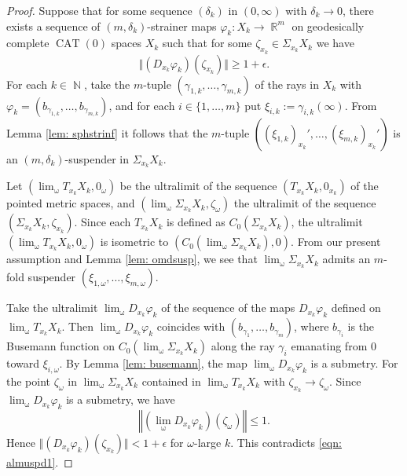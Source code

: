 \documentclass[a4paper,12pt]{amsart}
\newcommand{\CAT}{\operatorname{CAT}}
\newcommand{\ulim}{\operatorname{\lim_{\omega}}}
\newcommand{\R}{\operatorname{\mathbb{R}}}
\newcommand{\N}{\operatorname{\mathbb{N}}}
\numberwithin{equation}{section}
\theoremstyle{plain}
\theoremstyle{definition}
\theoremstyle{remark}
\begin{document}
\begin{proof}
Suppose that for some sequence $(\delta_k)$ in $(0,\infty)$ 
with $\delta_k \to 0$,
there exists a sequence of $(m,\delta_k)$-strainer maps
$\varphi_k \colon X_k \to \R^m$
on geodesically complete $\CAT(0)$ spaces $X_k$
such that for some $\zeta_{x_k} \in \Sigma_{x_k}X_k$ 
we have
\begin{equation}
\Vert \left( D_{x_k}\varphi_k \right) \left( \zeta_{x_k} \right) \Vert 
\ge 1+\epsilon.
\label{eqn: almuspd1}
\end{equation}
For each $k \in \N$,
take the $m$-tuple 
$\left( \gamma_{1,k}, \dots, \gamma_{m,k} \right)$
of the rays in $X_k$
with
$\varphi_k = \left( b_{\gamma_{1,k}}, \dots, b_{\gamma_{m,k}} \right)$,
and for each $i \in \{ 1, \dots, m\}$
put $\xi_{i,k} := \gamma_{i,k}(\infty)$.
From Lemma \ref{lem: sphstrinf} it follows that
the $m$-tuple $\left( (\xi_{1,k})_{x_k}', \dots, (\xi_{m,k})_{x_k}' \right)$
is an $(m,\delta_k)$-suspender in $\Sigma_{x_k}X_k$.

Let 
$\left( \ulim T_{x_k}X_k, 0_{\omega} \right)$
be the ultralimit of the sequence $\left( T_{x_k}X_k, 0_{x_k} \right)$
of the pointed metric spaces,
and 
$\left( \ulim \Sigma_{x_k}X_k, \zeta_{\omega} \right)$
the ultralimit of the sequence $\left( \Sigma_{x_k}X_k, \zeta_{x_k} \right)$.
Since each $T_{x_k}X_k$ is defined as
$C_0 \left( \Sigma_{x_k}X_k \right)$,
the ultralimit $\left( \ulim T_{x_k}X_k, 0_{\omega} \right)$
is isometric to $\left( C_0 \left( \ulim \Sigma_{x_k}X_k \right), 0 \right)$.
From our present assumption and Lemma \ref{lem: omdsusp},
we see that
$\ulim \Sigma_{x_k}X_k$ admits an $m$-fold suspender 
$\left( \xi_{1,\omega}, \dots, \xi_{m,\omega} \right)$.

Take the ultralimit $\ulim D_{x_k}\varphi_k$
of the sequence of the maps $D_{x_k}\varphi_k$
defined on $\ulim T_{x_k}X_k$.
Then $\ulim D_{x_k}\varphi_k$ coincides with 
$\left( b_{\gamma_1}, \dots, b_{\gamma_m} \right)$, 
where $b_{\gamma_i}$ is the Busemann function on 
$C_0 \left( \ulim \Sigma_{x_k}X_k \right)$ 
along the ray $\gamma_i$ emanating from $0$ toward $\xi_{i,\omega}$.
By Lemma \ref{lem: busemann},
the map $\ulim D_{x_k}\varphi_k$ is a submetry.
For the point
$\zeta_{\omega}$ in 
$\ulim \Sigma_{x_k}X_k$ contained in $\ulim T_{x_k}X_k$
with $\zeta_{x_k} \to \zeta_{\omega}$.
Since $\ulim D_{x_k}\varphi_k$ is a submetry,
we have
\[
\left\Vert \left( \ulim D_{x_k}\varphi_k \right) \left( \zeta_{\omega} \right) \right\Vert \le 1.
\]
Hence $\Vert \left( D_{x_k}\varphi_k \right) \left( \zeta_{x_k} \right) \Vert 
< 1+\epsilon$
for $\omega$-large $k$.
This contradicts \eqref{eqn: almuspd1}.
\end{proof}
\end{document}

